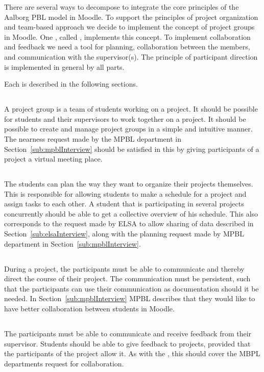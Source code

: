 There are several ways to decompose \system{} to integrate the core principles of the Aalborg PBL model in Moodle. 
To support the principles of project organization and team-based approach we decide to implement the concept of project groups in Moodle. 
One \subsystem{}, called \administrationgroup{}, implements this concept.
To implement collaboration and feedback we need a tool for planning, collaboration between the members, and communication with the supervisor(s). 
The principle of participant direction is implemented in general by all parts. 

Each \subsystem{} is described in the following sections.

\subsection{\administrationgroup{}} %
\label{sec:admgroupdecom}
A project group is a team of students working on a project.
It should be possible for students and their supervisors to work together on a project.
It should be possible to create and manage project groups in a simple and intuitive manner.
The nearness request made by the MPBL department in Section~\ref{sub:mpblInterview} should be satisfied in this \subsystem{} by giving participants of a project a virtual meeting place.

\subsection{\timelinegroup{}} %
\label{sec:tmlgroupdecom}
The students can plan the way they want to organize their projects themselves.
This \subsystem{} is responsible for allowing students to make a schedule for a project and assign tasks to each other.
A student that is participating in several projects concurrently should be able to get a collective overview of his schedule.
This also corresponds to the request made by ELSA to allow sharing of data described in Section~\ref{sub:elsaInterview}, along with the planning request made by MPBL department in Section~\ref{sub:mpblInterview}.

\subsection{\blackboardgroup{}} %
During a project, the participants must be able to communicate and thereby direct the course of their project.
The communication must be persistent, such that the participants can use their communication as documentation should it be needed.
In Section~\ref{sub:mpblInterview} MPBL describes that they would like to have better collaboration between students in Moodle.

\subsection{\supervisorgroup{}} %
The participants must be able to communicate and receive feedback from their supervisor.
Students should be able to give feedback to projects, provided that the participants of the project allow it.
As with the \blackboardgroup{} \subsystem{}, this \subsystem{} should cover the MBPL departments request for collaboration.


